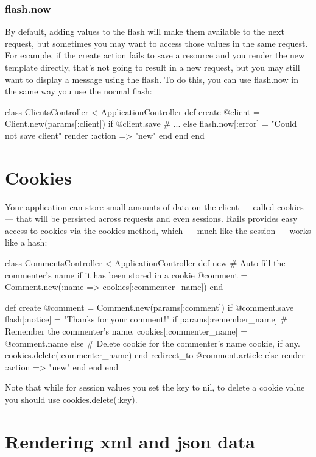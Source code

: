 \documentclass[10pt]{book}
\newenvironment{code}{%
  \scriptsize
    \verbatim
}{%
    \endverbatim
    \newline
}
\begin{document}
\subsubsection{ flash.now}

By default, adding values to the flash will make them available to  the next request, but sometimes you may want to access those values in  the same request. For example, if the create action fails to save a resource and you render the new  template directly, that’s not going to result in a new request, but you  may still want to display a message using the flash. To do this, you  can use flash.now in the same way you use the normal flash:
\begin{code}
class ClientsController < ApplicationController
  def create
    @client = Client.new(params[:client])
    if @client.save
      # ...
    else
      flash.now[:error] = "Could not save client"
      render :action => "new"
    end
  end
end
\end{code}

\section{ Cookies}

Your application can store small amounts of data on the client —  called cookies — that will be persisted across requests and even  sessions. Rails provides easy access to cookies via the cookies method, which — much like the session — works like a hash:
\begin{code}
class CommentsController < ApplicationController
  def new
    # Auto-fill the commenter's name if it has been stored in a cookie
    @comment = Comment.new(:name => cookies[:commenter_name])
  end
 
  def create
    @comment = Comment.new(params[:comment])
    if @comment.save
      flash[:notice] = "Thanks for your comment!"
      if params[:remember_name]
        # Remember the commenter's name.
        cookies[:commenter_name] = @comment.name
      else
        # Delete cookie for the commenter's name cookie, if any.
        cookies.delete(:commenter_name)
      end
      redirect_to @comment.article
    else
      render :action => "new"
    end
  end
end
\end{code}

Note that while for session values you set the key to nil, to delete a cookie value you should use cookies.delete(:key).

\section{ Rendering xml and json data}
\end{document}
